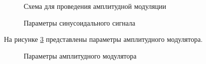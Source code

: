 \documentclass[a4paper,14pt]{extarticle}
\begin{document}
\begin{figure}[H]
\caption{Схема для проведения амплитудной модуляции}
\label{0}
\end{figure}

\begin{figure}[H]
\caption{Параметры синусоидального сигнала}
\label{1}
\end{figure}

На рисунке \ref{2} представлены параметры амплитудного модулятора.

\begin{figure}[H]
\caption{Параметры амплитудного модулятора}
\label{2}
\end{figure}
\end{document}
